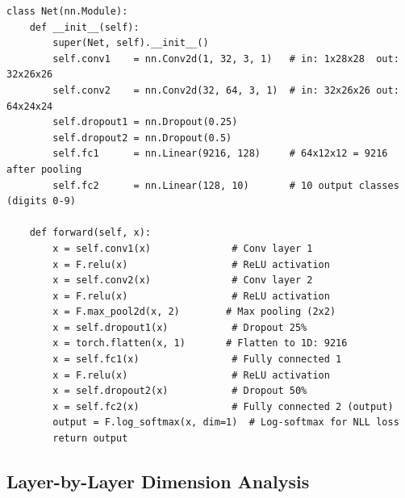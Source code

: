 \documentclass[12pt,a4paper,openany]{report}
\begin{document}
\begin{verbatim}
class Net(nn.Module):
    def __init__(self):
        super(Net, self).__init__()
        self.conv1    = nn.Conv2d(1, 32, 3, 1)   # in: 1x28x28  out: 32x26x26
        self.conv2    = nn.Conv2d(32, 64, 3, 1)  # in: 32x26x26 out: 64x24x24
        self.dropout1 = nn.Dropout(0.25)
        self.dropout2 = nn.Dropout(0.5)
        self.fc1      = nn.Linear(9216, 128)     # 64x12x12 = 9216 after pooling
        self.fc2      = nn.Linear(128, 10)       # 10 output classes (digits 0-9)

    def forward(self, x):
        x = self.conv1(x)              # Conv layer 1
        x = F.relu(x)                  # ReLU activation
        x = self.conv2(x)              # Conv layer 2
        x = F.relu(x)                  # ReLU activation
        x = F.max_pool2d(x, 2)        # Max pooling (2x2)
        x = self.dropout1(x)           # Dropout 25%
        x = torch.flatten(x, 1)       # Flatten to 1D: 9216
        x = self.fc1(x)                # Fully connected 1
        x = F.relu(x)                  # ReLU activation
        x = self.dropout2(x)           # Dropout 50%
        x = self.fc2(x)                # Fully connected 2 (output)
        output = F.log_softmax(x, dim=1)  # Log-softmax for NLL loss
        return output
\end{verbatim}

\subsection{Layer-by-Layer Dimension Analysis}
\end{document}
